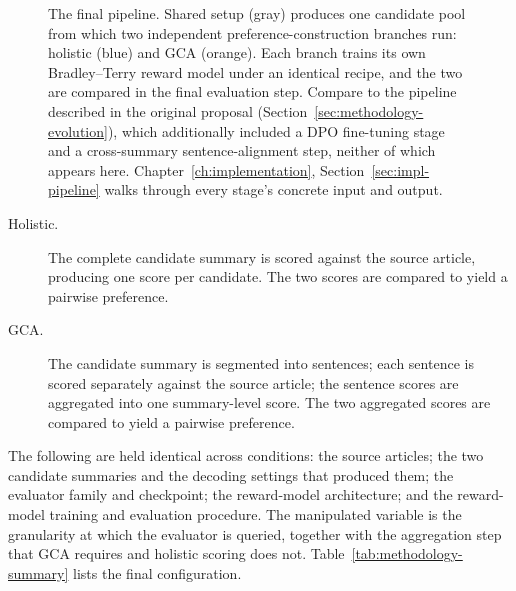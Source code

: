 \begin{figure}[htbp]
\begin{tikzpicture}
\end{tikzpicture}
\caption[The final experimental pipeline]{The final pipeline. Shared setup (gray) produces one candidate pool from
which two independent preference-construction branches run: holistic (blue) and
GCA (orange). Each branch trains its own Bradley--Terry reward model under an
identical recipe, and the two are compared in the final evaluation step. Compare
to the pipeline described in the original proposal
(Section~\ref{sec:methodology-evolution}), which additionally included a DPO
fine-tuning stage and a cross-summary sentence-alignment step, neither of
which appears here. Chapter~\ref{ch:implementation},
Section~\ref{sec:impl-pipeline} walks through every stage's concrete input
and output.}
\label{fig:pipeline}
\end{figure}

\begin{description}
  \item[Holistic.] The complete candidate summary is scored against the source
    article, producing one score per candidate. The two scores are compared to
    yield a pairwise preference.
  \item[GCA.] The candidate summary is segmented into sentences; each sentence is
    scored separately against the source article; the sentence scores are
    aggregated into one summary-level score. The two aggregated scores are
    compared to yield a pairwise preference.
\end{description}

The following are held identical across conditions: the source articles; the two
candidate summaries and the decoding settings that produced them; the evaluator
family and checkpoint; the reward-model architecture; and the reward-model
training and evaluation procedure. The manipulated variable is the granularity at
which the evaluator is queried, together with the aggregation step that GCA
requires and holistic scoring does not.
Table~\ref{tab:methodology-summary} lists the final configuration.

